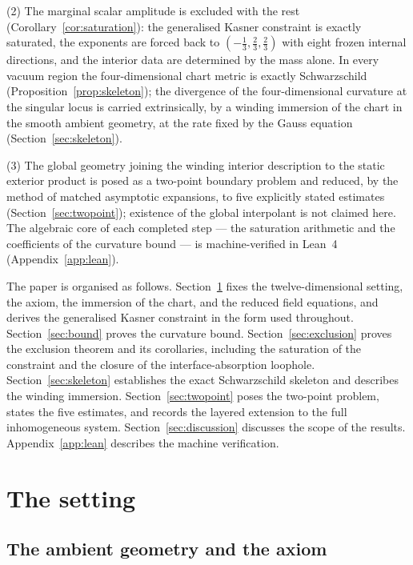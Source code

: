 \documentclass[11pt]{article}
\numberwithin{equation}{section}
\theoremstyle{plain}
\theoremstyle{definition}
\theoremstyle{remark}
\begin{document}
(2) The marginal scalar amplitude is excluded with the rest
(Corollary~\ref{cor:saturation}): the generalised Kasner constraint is
exactly saturated, the exponents are forced back to
$(-\tfrac13, \tfrac23, \tfrac23)$ with eight frozen internal
directions, and the interior data are determined by the mass alone.
In every vacuum region the four-dimensional chart metric is exactly
Schwarzschild (Proposition~\ref{prop:skeleton}); the divergence of the
four-dimensional curvature at the singular locus is carried
extrinsically, by a winding immersion of the chart in the smooth
ambient geometry, at the rate fixed by the Gauss equation
(Section~\ref{sec:skeleton}).

(3) The global geometry joining the winding interior description to
the static exterior product is posed as a two-point boundary problem
and reduced, by the method of matched asymptotic expansions, to five
explicitly stated estimates (Section~\ref{sec:twopoint}); existence of
the global interpolant is not claimed here. The algebraic core of each
completed step --- the saturation arithmetic and the coefficients of
the curvature bound --- is machine-verified in Lean~4
(Appendix~\ref{app:lean}).

The paper is organised as follows. Section~\ref{sec:setting} fixes the
twelve-dimensional setting, the axiom, the immersion of the chart, and
the reduced field equations, and derives the generalised Kasner
constraint in the form used throughout. Section~\ref{sec:bound} proves
the curvature bound. Section~\ref{sec:exclusion} proves the exclusion
theorem and its corollaries, including the saturation of the
constraint and the closure of the interface-absorption loophole.
Section~\ref{sec:skeleton} establishes the exact Schwarzschild
skeleton and describes the winding immersion. Section~\ref{sec:twopoint}
poses the two-point problem, states the five estimates, and records
the layered extension to the full inhomogeneous system.
Section~\ref{sec:discussion} discusses the scope of the results.
Appendix~\ref{app:lean} describes the machine verification.

\section{The setting}\label{sec:setting}

\subsection{The ambient geometry and the axiom}
\end{document}
